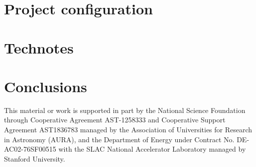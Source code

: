 \documentclass[11pt,twoside]{article}
\begin{document}
\section{Project configuration}

\section{Technotes}

\section{Conclusions}


\acknowledgements This material or work is supported in part by the National Science Foundation through Cooperative Agreement AST-1258333 and Cooperative Support Agreement AST1836783 managed by the Association of Universities for Research in Astronomy (AURA), and the Department of Energy under Contract No. DE-AC02-76SF00515 with the SLAC National Accelerator Laboratory managed by Stanford University.



\end{document}
